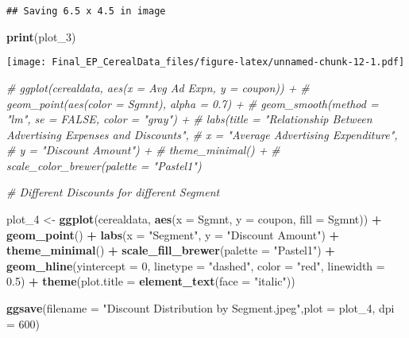 \documentclass[
]{article}
\newenvironment{Shaded}{\begin{snugshade}}{\end{snugshade}}
\newcommand{\AttributeTok}[1]{\textcolor[rgb]{0.13,0.29,0.53}{#1}}
\newcommand{\CommentTok}[1]{\textcolor[rgb]{0.56,0.35,0.01}{\textit{#1}}}
\newcommand{\DecValTok}[1]{\textcolor[rgb]{0.00,0.00,0.81}{#1}}
\newcommand{\FloatTok}[1]{\textcolor[rgb]{0.00,0.00,0.81}{#1}}
\newcommand{\FunctionTok}[1]{\textcolor[rgb]{0.13,0.29,0.53}{\textbf{#1}}}
\newcommand{\NormalTok}[1]{#1}
\newcommand{\OtherTok}[1]{\textcolor[rgb]{0.56,0.35,0.01}{#1}}
\newcommand{\SpecialCharTok}[1]{\textcolor[rgb]{0.81,0.36,0.00}{\textbf{#1}}}
\newcommand{\StringTok}[1]{\textcolor[rgb]{0.31,0.60,0.02}{#1}}
\begin{document}
\begin{verbatim}
## Saving 6.5 x 4.5 in image
\end{verbatim}

\begin{Shaded}
\begin{Highlighting}[]
\FunctionTok{print}\NormalTok{(plot\_3)}
\end{Highlighting}
\end{Shaded}

\texttt{[image: Final\_EP\_CerealData\_files/figure-latex/unnamed-chunk-12-1.pdf]}

\begin{Shaded}
\begin{Highlighting}[]
\CommentTok{\# ggplot(cerealdata, aes(x = \textasciigrave{}Avg Ad Expn\textasciigrave{}, y = coupon)) +}
\CommentTok{\#   geom\_point(aes(color = Sgmnt), alpha = 0.7) + }
\CommentTok{\#   geom\_smooth(method = "lm", se = FALSE, color = "gray") +}
\CommentTok{\#   labs(title = "Relationship Between Advertising Expenses and Discounts",}
\CommentTok{\#        x = "Average Advertising Expenditure",}
\CommentTok{\#        y = "Discount Amount") +}
\CommentTok{\#   theme\_minimal() +}
\CommentTok{\#   scale\_color\_brewer(palette = "Pastel1")}
\end{Highlighting}
\end{Shaded}

\begin{Shaded}
\begin{Highlighting}[]
\CommentTok{\# Different Discounts for different Segment}

\NormalTok{plot\_4 }\OtherTok{\textless{}{-}} \FunctionTok{ggplot}\NormalTok{(cerealdata, }\FunctionTok{aes}\NormalTok{(}\AttributeTok{x =}\NormalTok{ Sgmnt, }\AttributeTok{y =}\NormalTok{ coupon, }\AttributeTok{fill =}\NormalTok{ Sgmnt)) }\SpecialCharTok{+}
  \FunctionTok{geom\_point}\NormalTok{() }\SpecialCharTok{+}
  \FunctionTok{labs}\NormalTok{(}\AttributeTok{x =} \StringTok{"Segment"}\NormalTok{,}
       \AttributeTok{y =} \StringTok{"Discount Amount"}\NormalTok{) }\SpecialCharTok{+}
  \FunctionTok{theme\_minimal}\NormalTok{() }\SpecialCharTok{+}
  \FunctionTok{scale\_fill\_brewer}\NormalTok{(}\AttributeTok{palette =} \StringTok{"Pastel1"}\NormalTok{) }\SpecialCharTok{+}
  \FunctionTok{geom\_hline}\NormalTok{(}\AttributeTok{yintercept =} \DecValTok{0}\NormalTok{, }\AttributeTok{linetype =} \StringTok{"dashed"}\NormalTok{, }\AttributeTok{color =} \StringTok{"red"}\NormalTok{, }\AttributeTok{linewidth =} \FloatTok{0.5}\NormalTok{) }\SpecialCharTok{+}
  \FunctionTok{theme}\NormalTok{(}\AttributeTok{plot.title =} \FunctionTok{element\_text}\NormalTok{(}\AttributeTok{face =} \StringTok{"italic"}\NormalTok{))}


\FunctionTok{ggsave}\NormalTok{(}\AttributeTok{filename =} \StringTok{"Discount Distribution by Segment.jpeg"}\NormalTok{,}\AttributeTok{plot =}\NormalTok{ plot\_4, }\AttributeTok{dpi =} \DecValTok{600}\NormalTok{)}
\end{Highlighting}
\end{Shaded}
\end{document}
